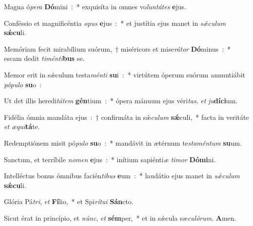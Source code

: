 ﻿\item Magna ó\emph{pe}\-\emph{ra} \textbf{Dó}\-mini~:~* exquisíta in omnes vo\emph{lun}\-\emph{tá}\-\emph{tes} \textbf{e}jus.
\item Conféssio et magnificéntia \emph{o}\-\emph{pus} \textbf{e}jus~:~* et justítia ejus manet in \emph{sǽ}\-\emph{cu}\-\emph{lum} \textbf{sǽ}\textbf{cu}li.
\item Memóriam fecit mi\-ra\-bí\-li\-um suórum,~† miséricors et mise\emph{rá}\-\emph{tor} \textbf{Dó}\-minus~:~* escam dedit \emph{ti}\-\emph{mén}\-\emph{ti}\-\textbf{bus} se.
\item Memor erit in sǽculum testa\emph{mén}\-\emph{ti} \textbf{su}\-i~:~* virtútem óperum suórum annuntiábit \emph{pó}\-\emph{pu}\-\emph{lo} \textbf{su}o~:
\item Ut det illis heredi\emph{tá}\-\emph{tem} \textbf{gén}\-tium~:~* ópera mánuum ejus véri\emph{tas}, \emph{et} \emph{ju}\textbf{dí}\textbf{ci}um.
\item Fidélia ómnia mandáta ejus~:~† confirmáta in sǽ\emph{cu}\-\emph{lum} \textbf{sǽ}\-culi,~* facta in veritáte \emph{et} \emph{æ}\emph{qui}\textbf{tá}te.
\item Redemptiónem misit pó\emph{pu}\-\emph{lo} \textbf{su}\-o~:~* mandávit in ætérnum te\emph{sta}\-\emph{mén}\-\emph{tum} \textbf{su}um.
\item Sanctum, et terríbile \emph{no}\-\emph{men} \textbf{e}jus~:~* inítium sapiénti\emph{æ} \emph{ti}\-\emph{mor} \textbf{Dó}\textbf{mi}ni.
\item Intelléctus bonus ómnibus facién\emph{ti}\-\emph{bus} \textbf{e}\-um~:~* laudátio ejus manet in \emph{sǽ}\-\emph{cu}\-\emph{lum} \textbf{sǽ}\textbf{cu}li.
\item Glória Pá\emph{tri}, \emph{et} \textbf{Fí}\-lio,~* et Spi\emph{rí}\-\emph{tu}\-\emph{i} \textbf{Sán}cto.
\item Sicut érat in princípio, et \emph{núnc}, \emph{et} \textbf{sém}\-per,~* et in sǽcula sæ\emph{cu}\-\emph{ló}\-\emph{rum}. \textbf{A}men.